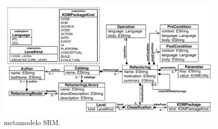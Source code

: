 \begin{figure}[h]
	\centering
	\includegraphics[scale=0.65]{images/refactoring_metamodel}
	\caption{metamodelo SRM.}
	\label{fig:meta_modelo_SRM}
\end{figure}

